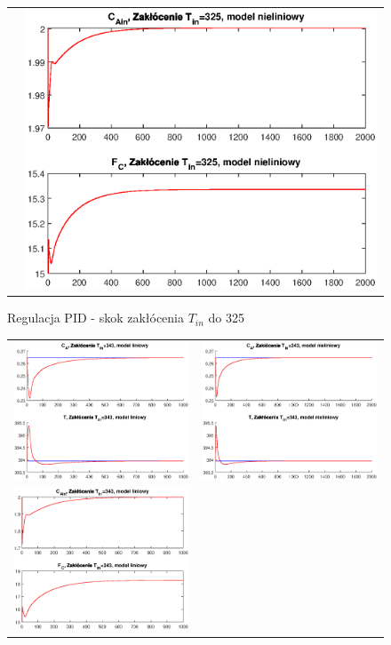 \begin{figure}
\begin{tabular}{cc}
	&
	\includegraphics[width=.5\linewidth]{img/pidnlin/pidnlin9.eps}
\end{tabular}
\label{ch2:pid5}
\caption{Regulacja PID - skok zakłócenia $T_{in}$ do 325}
\end{figure}
\newpage
\begin{figure}
\begin{tabular}{cc}
	\includegraphics[width=.5\linewidth]{img/pidlin/pidlin12.eps}
	&
	\includegraphics[width=.5\linewidth]{img/pidnlin/pidnlin12.eps}
	\\
	\includegraphics[width=.5\linewidth]{img/pidlin/pidlin11.eps}

\end{tabular}
\end{figure}
